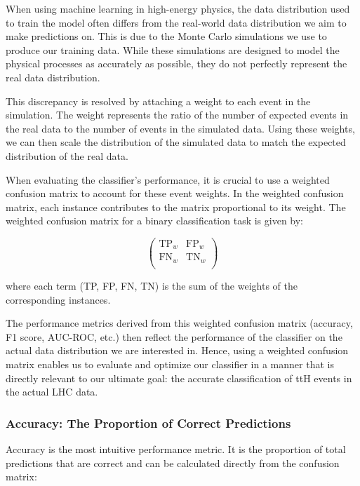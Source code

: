 When using machine learning in high-energy physics, the data distribution used to train the model often differs from the
real-world data distribution we aim to make predictions on. This is due to the Monte Carlo simulations we use to produce
our training data. While these simulations are designed to model the physical processes as accurately as possible, they
do not perfectly represent the real data distribution.

This discrepancy is resolved by attaching a weight to each event in the simulation. The weight represents the ratio of
the number of expected events in the real data to the number of events in the simulated data. Using these weights, we
can then scale the distribution of the simulated data to match the expected distribution of the real data.

When evaluating the classifier's performance, it is crucial to use a weighted confusion matrix to account for these
event weights. In the weighted confusion matrix, each instance contributes to the matrix proportional to its weight. The
weighted confusion matrix for a binary classification task is given by:

\begin{equation}
    \begin{pmatrix}
        \text{TP}_{w} & \text{FP}_{w} \\
        \text{FN}_{w} & \text{TN}_{w} \\
    \end{pmatrix}
\end{equation}

where each term (TP, FP, FN, TN) is the sum of the weights of the corresponding instances.

The performance metrics derived from this weighted confusion matrix (accuracy, F1 score, AUC-ROC, etc.) then reflect the
performance of the classifier on the actual data distribution we are interested in. Hence, using a weighted confusion
matrix enables us to evaluate and optimize our classifier in a manner that is directly relevant to our ultimate goal:
the accurate classification of ttH events in the actual LHC data.

\subsubsection{Accuracy: The Proportion of Correct Predictions}

Accuracy is the most intuitive performance metric. It is the proportion of total predictions that are correct and can be
calculated directly from the confusion matrix:

